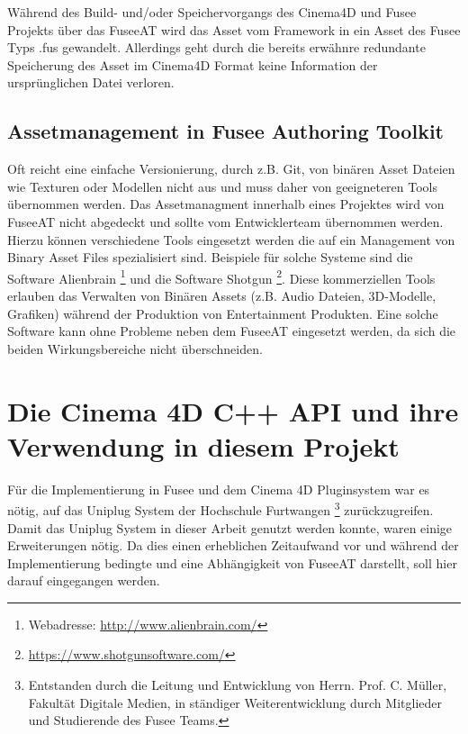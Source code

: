 \documentclass[pagesize, paper=a4, fontsize=12pt, titlepage=true, headings=small, headnosepline, abstractoff, liststotoc, nochapterprefix, plainheadsepline, twoside]{scrreprt}
\begin{document}
Während des Build- und/oder Speichervorgangs des Cinema4D und Fusee Projekts über das FuseeAT wird das Asset vom Framework in ein Asset des Fusee Typs .fus gewandelt. Allerdings geht durch die bereits erwähnre redundante Speicherung des Asset im Cinema4D Format keine Information der ursprünglichen Datei verloren.

\subsection{Assetmanagement in Fusee Authoring Toolkit}
Oft reicht eine einfache Versionierung, durch z.B. Git, von binären Asset Dateien wie Texturen oder Modellen nicht aus und muss daher von geeigneteren Tools übernommen werden.
Das Assetmanagment innerhalb eines Projektes wird von FuseeAT nicht abgedeckt und sollte vom Entwicklerteam übernommen werden. Hierzu können verschiedene Tools eingesetzt werden die auf ein Management von Binary Asset Files spezialisiert sind. Beispiele für solche Systeme sind die Software Alienbrain \autocite{Alienbrain}\footnote{Webadresse: \url{http://www.alienbrain.com/}} und die Software Shotgun \autocite{Shotgun}\footnote{\url{https://www.shotgunsoftware.com/}}. Diese kommerziellen Tools erlauben das Verwalten von Binären Assets (z.B. Audio Dateien, 3D-Modelle, Grafiken) während der Produktion von Entertainment Produkten. Eine solche Software kann ohne Probleme neben dem FuseeAT eingesetzt werden, da sich die beiden Wirkungsbereiche nicht überschneiden.

\section{Die Cinema 4D C++ API und ihre Verwendung in diesem Projekt}
Für die Implementierung in Fusee und dem Cinema 4D Pluginsystem war es nötig, auf das Uniplug System der Hochschule Furtwangen \footnote{Entstanden durch die Leitung und Entwicklung von Herrn. Prof. C. Müller, Fakultät Digitale Medien, in ständiger Weiterentwicklung durch Mitglieder und Studierende des Fusee Teams.} zurückzugreifen. Damit das Uniplug System in dieser Arbeit genutzt werden konnte, waren einige Erweiterungen nötig. Da dies einen erheblichen Zeitaufwand vor und während der Implementierung bedingte und eine Abhängigkeit von FuseeAT darstellt, soll hier darauf eingegangen werden.
\end{document}
